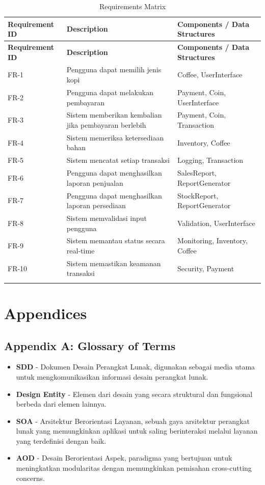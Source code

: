 \documentclass[12pt]{article}
\begin{document}
\begin{longtable}{|p{3cm}|p{5cm}|p{5cm}|}
\hline
\textbf{Requirement ID} & \textbf{Description} & \textbf{Components / Data Structures} \\
\hline
\endfirsthead
\hline
\textbf{Requirement ID} & \textbf{Description} & \textbf{Components / Data Structures} \\
\hline
\endhead
FR-1 & Pengguna dapat memilih jenis kopi & Coffee, UserInterface \\
\hline
FR-2 & Pengguna dapat melakukan pembayaran & Payment, Coin, UserInterface \\
\hline
FR-3 & Sistem memberikan kembalian jika pembayaran berlebih & Payment, Coin, Transaction \\
\hline
FR-4 & Sistem memeriksa ketersediaan bahan & Inventory, Coffee \\
\hline
FR-5 & Sistem mencatat setiap transaksi & Logging, Transaction \\
\hline
FR-6 & Pengguna dapat menghasilkan laporan penjualan & SalesReport, ReportGenerator \\
\hline
FR-7 & Pengguna dapat menghasilkan laporan persediaan & StockReport, ReportGenerator \\
\hline
FR-8 & Sistem memvalidasi input pengguna & Validation, UserInterface \\
\hline
FR-9 & Sistem memantau status secara real-time & Monitoring, Inventory, Coffee \\
\hline
FR-10 & Sistem memastikan keamanan transaksi & Security, Payment \\
\hline
\caption{Requirements Matrix}
\label{table:req_matrix}
\end{longtable}

\section{Appendices}

\subsection{Appendix A: Glossary of Terms}

\begin{itemize}
    \item \textbf{SDD} - Dokumen Desain Perangkat Lunak, digunakan sebagai media utama untuk mengkomunikasikan informasi desain perangkat lunak.
    \item \textbf{Design Entity} - Elemen dari desain yang secara struktural dan fungsional berbeda dari elemen lainnya.
    \item \textbf{SOA} - Arsitektur Berorientasi Layanan, sebuah gaya arsitektur perangkat lunak yang memungkinkan aplikasi untuk saling berinteraksi melalui layanan yang terdefinisi dengan baik.
    \item \textbf{AOD} - Desain Berorientasi Aspek, paradigma yang bertujuan untuk meningkatkan modularitas dengan memungkinkan pemisahan cross-cutting concerns.
\end{itemize}
\end{document}
